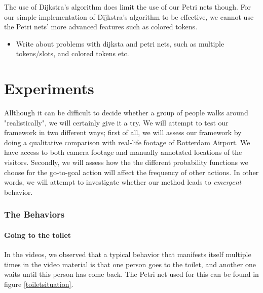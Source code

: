 \documentclass[11pt]{book}
\begin{document}
The use of Dijkstra's algorithm does limit the use of our Petri nets though. For our simple implementation of Dijkstra's algorithm to be effective, we cannot use the Petri nets' more advanced features such as colored tokens.

\begin{itemize}
\item Write about problems with dijksta and petri nets, such as multiple tokens/slots, and colored tokens etc.
\end{itemize}



\section{Experiments}
Allthough it can be difficult to decide whether a group of people walks around "realistically", we will certainly give it a try. We will attempt to test our framework in two different ways; first of all, we will assess our framework by doing a qualitative comparison with real-life footage of Rotterdam Airport. We have access to both camera footage and manually annotated locations of the visitors. Secondly, we will assess how the the different probability functions we choose for the go-to-goal action will affect the frequency of other actions. In other words, we will attempt to investigate whether our method leads to \emph{emergent}  behavior.


\subsubsection{The Behaviors}

\paragraph{Going to the toilet}
In the videos, we observed that a typical behavior that manifests itself multiple times in the video material is that one person goes to the toilet, and another one waits until this person has come back. The Petri net used for this can be found in figure \ref{toiletsituation}.

\end{document}
